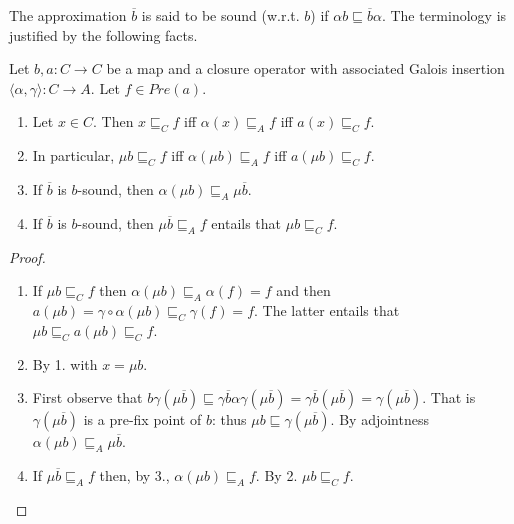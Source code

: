 \documentclass{llncs}
\begin{document}
The approximation $\overline{b}$ is said to be sound (w.r.t. $b$) if
$\alpha b \sqsubseteq \overline{b} \alpha$. 
The terminology is justified by the following facts.
%
%
%
\begin{lemma}\label{lemma:absouncomplete}
Let $b,a\colon C \to C$ be a map and a closure operator with associated Galois insertion $\langle \alpha, \gamma \rangle \colon C \to A$. Let $f\in Pre(a)$.
\begin{enumerate}
\item Let $x\in C$. Then  $x \sqsubseteq_C f$ iff $\alpha(x) \sqsubseteq_A f$ iff $a(x) \sqsubseteq_C f$.
\item In particular, $\mu b \sqsubseteq_C f$ iff $\alpha(\mu b) \sqsubseteq_A f$ iff $a(\mu b) \sqsubseteq_C f$.
\item  If $\overline{b}$ is $b$-sound, then $\alpha(\mu b) \sqsubseteq_A \mu \overline{b}$.
\item If $\overline{b}$ is $b$-sound, then $\mu \overline{b} \sqsubseteq_A f$ entails that $\mu b \sqsubseteq_C f$.
\end{enumerate} 
\end{lemma}
%
\begin{proof}
\begin{enumerate}
\item If $\mu b \sqsubseteq_C f$ then $\alpha(\mu b) \sqsubseteq_A \alpha(f) = f$ and then $a (\mu b) = \gamma\circ \alpha(\mu b) \sqsubseteq_C \gamma(f) = f$. The latter entails that $\mu b \sqsubseteq_C a(\mu b) \sqsubseteq_C f$.
\item By 1. with $x=\mu b$.
\item First observe that $b\gamma(\mu \overline{b}) \sqsubseteq \gamma \overline{b}\alpha \gamma (\mu \overline{b}) = \gamma \overline{b}(\mu \overline{b})= \gamma(\mu \overline{b})$. That is $\gamma(\mu \overline{b})$ is a pre-fix point of $b$: thus $\mu b \sqsubseteq \gamma(\mu \overline{b})$. By adjointness $\alpha(\mu b) \sqsubseteq_A \mu \overline{b}$.
\item If $\mu \overline{b} \sqsubseteq_A f$ then, by 3., $\alpha(\mu b)  \sqsubseteq_A f$. By 2. $\mu b \sqsubseteq_C f$.
\end{enumerate}
\end{proof}
\end{document}
